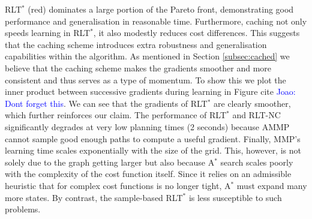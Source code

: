 \documentclass[letterpaper, 10 pt, conference]{ieeeconf}
\newcommand{\jm}[1]{\textcolor{blue}{Joao: #1}}
\begin{document}
	 RLT$^*$ (red) dominates a large portion of the Pareto front, demonstrating good performance and generalisation in reasonable time. Furthermore, caching not only speeds learning in RLT$^*$, it also modestly reduces cost differences. This suggests that the caching scheme introduces extra robustness and generalisation capabilities within the algorithm. As mentioned in Section \ref{subsec:cached} we believe that the caching scheme makes the gradients smoother and more consistent and thus serves as a type of momentum. To show this we plot the inner product between successive gradients during learning in Figure cite \jm{Dont forget this}. We can see that the gradients of RLT$^*$ are clearly smoother, which further reinforces our claim. The performance of RLT$^*$ and RLT-NC significantly degrades at very low planning times (2 seconds) because AMMP cannot sample good enough paths to compute a useful gradient. Finally, MMP's learning time scales exponentially with the size of the grid. This, however, is not solely due to the graph getting larger but also because A$^*$ search scales poorly with the complexity of the cost function itself. Since it relies on an admissible heuristic that for complex cost functions is no longer tight, A$^*$ must expand many more states. By contrast, the sample-based RLT$^*$ is less susceptible to such problems.
\end{document}
